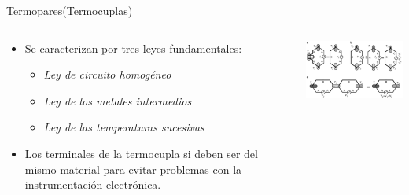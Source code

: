 \documentclass[aspectratio=169]{beamer}
\begin{document}
\begin{frame}{Termopares(Termocuplas)}
    \begin{columns}[c, onlytextwidth]
        \begin{column}{0.4\textwidth}
            \begin{itemize}
                \item Se caracterizan por tres leyes fundamentales: 
                \begin{itemize}
                    \item \textit{Ley de circuito homogéneo}
                    \item \textit{Ley de los metales intermedios}
                    \item \textit{Ley de las temperaturas sucesivas}
                \end{itemize}
                \item Los terminales de la termocupla si deben ser del mismo material para evitar problemas con la instrumentación electrónica.
            \end{itemize}
        \end{column}
        \begin{column}{0.5\textwidth}
            \includegraphics[width=7cm]{fig/termocouple.PNG}
            \\ \cite{Fraden_2016}
        \end{column}
    \end{columns}
\end{frame}
\end{document}
